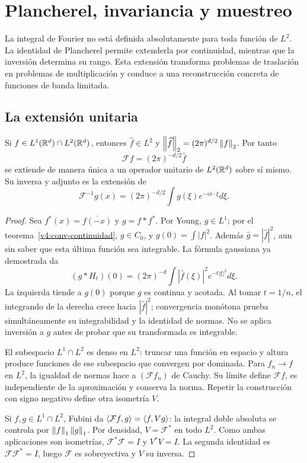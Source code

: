 \chapter{Plancherel, invariancia y muestreo}\label{cap:v4-08}
La integral de Fourier no está definida absolutamente para toda función de $L^2$. La identidad de Plancherel permite extenderla por continuidad, mientras que la inversión determina su rango. Esta extensión transforma problemas de traslación en problemas de multiplicación y conduce a una reconstrucción concreta de funciones de banda limitada.

\section{La extensión unitaria}\label{lectura:v4-13}
\begin{teorema}[Plancherel en $\R^d$]\label{v4:plancherel}
Si $f\in L^1(\mathbb R^d)\cap L^2(\mathbb R^d)$, entonces $\widehat f\in L^2$ y $\left\lVert\widehat f\right\rVert_2=(2\pi)^{d/2}\left\lVert f\right\rVert_2$. Por tanto
\[
 \mathcal Ff=(2\pi)^{-d/2}\widehat f
\]
se extiende de manera única a un operador unitario de $L^2(\mathbb R^d)$ sobre sí mismo. Su inversa y adjunto es la extensión de
\[
 \mathcal F^{-1}g(x)=(2\pi)^{-d/2}\int g(\xi)e^{-ix\cdot\xi}d\xi.
\]
\end{teorema}
\begin{proof}
Sea $f^*(x)=\overline{f(-x)}$ y $g=f*f^*$. Por Young, $g\in L^1$; por el teorema~\ref{v4:conv-continuidad}, $g\in C_0$, y $g(0)=\int|f|^2$. Además $\widehat g=|\widehat f|^2$, aun sin saber que esta última función sea integrable. La fórmula gaussiana ya demostrada da
\[
 (g*H_t)(0)=(2\pi)^{-d}\int |\widehat f(\xi)|^2e^{-t|\xi|^2}d\xi.
\]
La izquierda tiende a $g(0)$ porque $g$ es continua y acotada. Al tomar $t=1/n$, el integrando de la derecha crece hacia $|\widehat f|^2$; convergencia monótona prueba simultáneamente su integrabilidad y la identidad de normas. No se aplica inversión a $g$ antes de probar que su transformada es integrable.

El subespacio $L^1\cap L^2$ es denso en $L^2$: truncar una función en espacio y altura produce funciones de ese subespacio que convergen por dominada. Para $f_n\to f$ en $L^2$, la igualdad de normas hace a $(\mathcal Ff_n)$ de Cauchy. Su límite define $\mathcal Ff$, es independiente de la aproximación y conserva la norma. Repetir la construcción con signo negativo define otra isometría $V$.

Si $f,g\in L^1\cap L^2$, Fubini da $\left\langle\mathcal Ff,g\right\rangle=\left\langle f,Vg\right\rangle$: la integral doble absoluta se controla por $\left\lVert f\right\rVert_1\left\lVert g\right\rVert_1$. Por densidad, $V=\mathcal F^*$ en todo $L^2$. Como ambas aplicaciones son isometrías, $\mathcal F^*\mathcal F=I$ y $V^*V=I$. La segunda identidad es $\mathcal F\mathcal F^*=I$, luego $\mathcal F$ es sobreyectiva y $V$ su inversa.
\end{proof}
